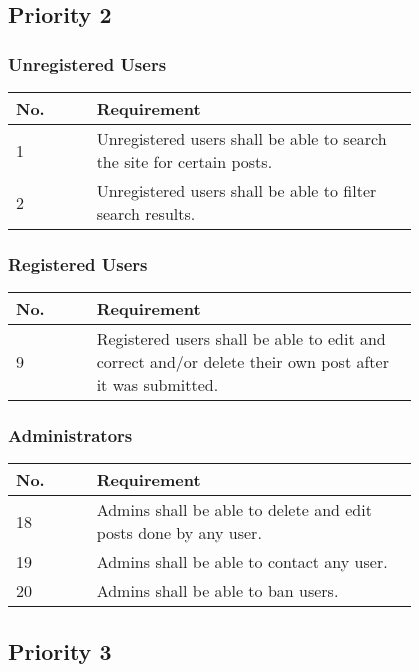 \subsection{Priority 2}
\subsubsection{Unregistered Users}
\begin{tabular}{ | l | p{0.8\linewidth} | }
\hline
No. & Requirement\\\hline
1 & Unregistered users shall be able to search the site for certain posts.\\\hline
2 & Unregistered users shall be able to filter search results.\\\hline
\end{tabular}
    
\subsubsection{Registered Users}
\begin{tabular}{ | l | p{0.8\linewidth} | }
\hline
No. & Requirement\\\hline
9 & Registered users shall be able to edit and correct and/or delete their own post after it was submitted.\\\hline
\end{tabular}
    
\subsubsection{Administrators}
\begin{tabular}{ | l | p{0.8\linewidth} | }
\hline
No. & Requirement\\\hline
18 & Admins shall be able to delete and edit posts done by any user.\\\hline
19 & Admins shall be able to contact any user.\\\hline
20 & Admins shall be able to ban users.\\\hline
\end{tabular}

\subsection{Priority 3}


